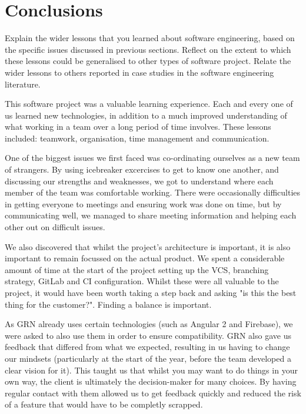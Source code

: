 \documentclass{l3proj}
\begin{document}
\section{Conclusions} %
\label{sec:conclusion}

Explain the wider lessons that you learned about software engineering,
based on the specific issues discussed in previous sections.  Reflect
on the extent to which these lessons could be generalised to other
types of software project.  Relate the wider lessons to others
reported in case studies in the software engineering literature.


This software project was a valuable learning experience. Each and every one of
 us learned new technologies, in addition to a much improved understanding
 of what working in a team over a long period of time involves. These lessons
 included: teamwork, organisation, time management and communication.

One of the biggest issues we first faced was co-ordinating ourselves as a
 new team of strangers. By using icebreaker excercises to get to know
 one another, and discussing our strengths and weaknesses, we got to
 understand where each member of the team was comfortable working. There
 were occasionally difficulties in getting everyone to meetings and ensuring
 work was done on time, but by communicating well, we managed to share
 meeting information and helping each other out on difficult issues.

We also discovered that whilst the project's architecture is important,
 it is also important to remain focussed on the actual product. We
 spent a considerable amount of time at the start of the project setting
 up the VCS, branching strategy, GitLab and CI configuration. Whilst these
 were all valuable to the project, it would have been worth taking a step
 back and asking "is this the best thing for the customer?". Finding a balance
 is important.

As GRN already uses certain technologies (such as Angular 2 and Firebase),
 we were asked to also use them in order to ensure compatibility. GRN also
 gave us feedback that differed from what we expected, resulting in us
 having to change our mindsets (particularly at the start of the year,
 before the team developed a clear vision for it). This taught us that
 whilst you may want to do things in your own way, the client is ultimately
 the decision-maker for many choices. By having regular contact with them
 allowed us to get feedback quickly and reduced the risk of a feature that
 would have to be completly scrapped.
\end{document}
